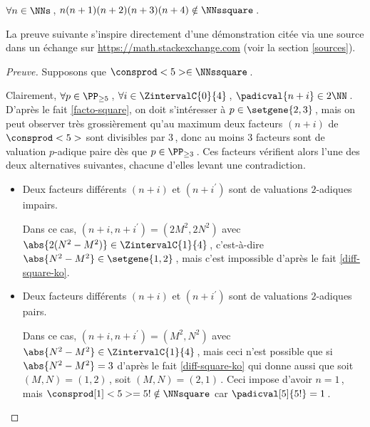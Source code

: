 \begin{fact} \label{case-5}
	 $\forall n \in \NNs$\,, $n(n+1)(n+2)(n+3)(n+4) \notin \NNssquare$\,.
\end{fact}




La preuve suivante s'inspire directement d'une démonstration citée via une source dans un échange sur \url{https://math.stackexchange.com} (voir la section \ref{sources}).


\begin{proof}[Preuve]%
    Supposons que $\consprod<5> \in \NNssquare$\,.
    
    \smallskip
    
    Clairement, 
    $\forall p \in \PP_{\geq 5}$\,, 
    $\forall i \in \ZintervalC{0}{4}$\,, 
    $\padicval{n + i} \in 2 \NN$\,.
    D'après le fait \ref{facto-square}, on doit s'intéresser à $p \in \setgene{2, 3}$\,, mais on peut observer très grossièrement qu'au maximum deux facteurs $(n + i)$ de $\consprod<5>$ sont divisibles par $3$\,, donc au moins $3$ facteurs sont de valuation $p$-adique paire dès que $p \in \PP_{\geq 3}$\,.
    Ces facteurs vérifient alors l'une des deux alternatives suivantes,
    chacune d'elles levant une contradiction.
    \begin{itemize}
    	\medskip
		\item Deux facteurs différents $(n+i)$ et $(n+i^\prime)$ sont de valuations $2$-adiques impairs.
		
		\smallskip
		\noindent
		Dans ce cas, $(n+i, n+i^\prime) = (2 M^2, 2 N^2)$ avec $\abs{2(N^2 - M^2)} \in \ZintervalC{1}{4}$\,, c'est-à-dire $\abs{N^2 - M^2} \in \setgene{1, 2}$\,, mais c'est impossible d'après le fait \ref{diff-square-ko}.


    	\medskip
		\item Deux facteurs différents $(n+i)$ et $(n+i^\prime)$ sont de valuations $2$-adiques pairs.
		
		\smallskip
		\noindent
		Dans ce cas, $(n+i, n+i^\prime) = (M^2, N^2)$ avec $\abs{N^2 - M^2} \in \ZintervalC{1}{4}$\,, mais ceci n'est possible que si $\abs{N^2 - M^2} = 3$ d'après le fait \ref{diff-square-ko} qui donne aussi que soit $(M, N) = (1, 2)$\,, soit $(M, N) = (2, 1)$\,.
		Ceci impose d'avoir $n = 1$\,, mais $\consprod[1]<5> = 5! \notin \NNsquare$ car $\padicval[5]{5!} = 1$\,.
		\qedhere
    \end{itemize}
\end{proof}

